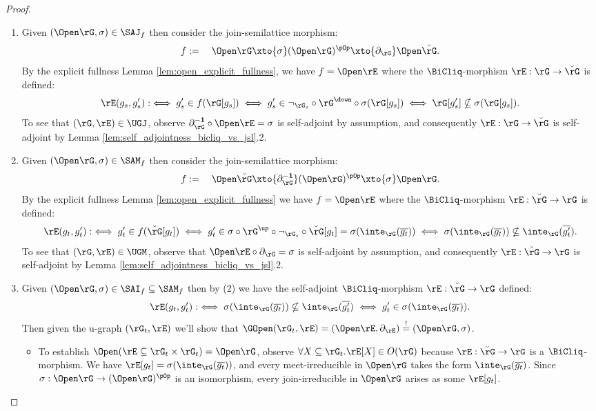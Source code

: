\documentclass{article}
\begin{document}
\begin{proof}
\item
\begin{enumerate}
\item
Given $(\Open\rG,\sigma) \in \SAJ_f$ then consider the join-semilattice morphism:
\[
f := \quad \Open\rG \xto{\sigma} (\Open\rG)^{\pOp} \xto{\partial_\rG} \Open\breve{\rG}.
\]
By the explicit fullness Lemma \ref{lem:open_explicit_fullness}, we have $f = \Open\rE$ where the $\BiCliq$-morphism $\rE : \rG \to \breve{\rG}$ is defined:
\[
\rE(g_s,g'_s) 
:\iff g'_s \in f(\rG[g_s])
\iff g'_s \in \neg_{\rG_s} \circ \rG^\down \circ \sigma(\rG[g_s])
\iff \rG[g'_s] \nsubseteq \sigma(\rG[g_s]).
\]
To see that $(\rG,\rE) \in \UGJ$, observe $\partial_\rG^{\bf-1} \circ \Open\rE = \sigma$ is self-adjoint by assumption, and consequently $\rE : \rG \to \breve{\rG}$ is self-adjoint by Lemma \ref{lem:self_adjointness_bicliq_vs_jsl}.2.


\item
Given $(\Open\rG,\sigma) \in \SAM_f$ then consider the join-semilattice morphism:
\[
f := \quad \Open\breve{\rG} \xto{\partial_\rG^{\bf-1}} (\Open\rG)^{\pOp} \xto{\sigma} \Open\rG.
\]
By the explicit fullness Lemma \ref{lem:open_explicit_fullness} we have $f = \Open\rE$ where the $\BiCliq$-morphism $\rE : \breve{\rG} \to \rG$ is defined:
\[
\rE(g_t,g'_t) 
:\iff g'_t \in f(\breve{\rG}[g_t])
\iff g'_t \in \sigma \circ \rG^\up \circ \neg_{\rG_s} \circ \breve{\rG}[g_t] = \sigma(\inte_\rG(\overline{g_t}))
\iff \sigma(\inte_\rG(\overline{g_t})) \nsubseteq \inte_\rG(\overline{g'_t}).
\]
To see that $(\rG,\rE) \in \UGM$, observe that $\Open\rE \circ \partial_\rG = \sigma$ is self-adjoint by assumption, and consequently $\rE : \breve{\rG} \to \rG$ is self-adjoint by Lemma \ref{lem:self_adjointness_bicliq_vs_jsl}.2.


\item
Given $(\Open\rG,\sigma) \in \SAI_f \subseteq \SAM_f$ then by (2) we have the self-adjoint $\BiCliq$-morphism $\rE : \breve{\rG} \to \rG$ defined:
\[
\rE(g_t,g'_t) 
:\iff \sigma(\inte_\rG(\overline{g_t})) \nsubseteq \inte_\rG(\overline{g'_t})
\iff g'_t \in \sigma(\inte_\rG(\overline{g_t})).
\]
Then given the u-graph $(\rG_t,\rE)$ we'll show that $\GOpen(\rG_t,\rE) = (\Open\rE,\partial_\rE) \stackrel{!}{=} (\Open\rG,\sigma)$.
\begin{itemize}
\item
To establish $\Open(\rE \subseteq \rG_t \times \rG_t) = \Open\rG$, observe $\forall X \subseteq \rG_t. \rE[X] \in O(\rG)$  because $\rE : \breve{\rG} \to \rG$ is a $\BiCliq$-morphism. We have $\rE[g_t] = \sigma(\inte_\rG(\overline{g_t}))$, and every meet-irreducible in $\Open\rG$ takes the form $\inte_\rG(\overline{g_t})$. Since $\sigma : \Open\rG \to (\Open\rG)^{\pOp}$ is an isomorphism, every join-irreducible in $\Open\rG$ arises as some $\rE[g_t]$.


\end{itemize}
\end{enumerate}
\end{proof}
\end{document}
